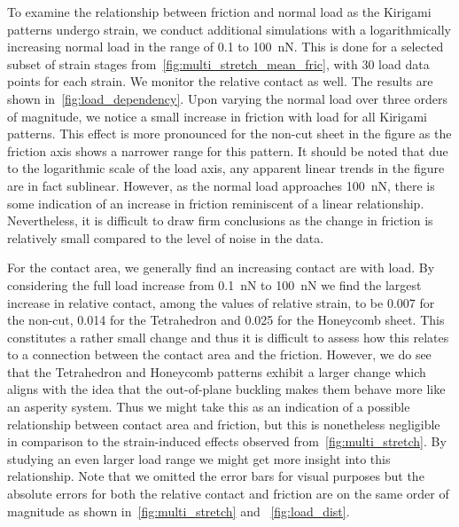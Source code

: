 To examine the relationship between friction and normal load as the Kirigami
patterns undergo strain, we conduct additional simulations with a
logarithmically increasing normal load in the range of 0.1 to \SI{100}{nN}. This
is done for a selected subset of strain stages
from~\cref{fig:multi_stretch_mean_fric}, with 30 load data points for each
strain. We monitor the relative contact as well. The results are shown
in~\cref{fig:load_dependency}. Upon varying the normal load over three orders of
magnitude, we notice a small increase in friction with load for all Kirigami
patterns. This effect is more pronounced for the non-cut sheet in the figure as
the friction axis shows a narrower range for this pattern. It should be noted
that due to the logarithmic scale of the load axis, any apparent linear trends
in the figure are in fact sublinear. However, as the normal load approaches
\SI{100}{nN}, there is some indication of an increase in friction
reminiscent of a linear relationship. Nevertheless, it is difficult to draw firm
conclusions as the change in friction is relatively small compared to the level
of noise in the data. 

For the contact area, we generally find an increasing contact are with load. By
considering the full load increase from \SI{0.1}{nN} to \SI{100}{nN} we find the
largest increase in relative contact, among the values of relative strain, to be
0.007 for the non-cut, 0.014 for the Tetrahedron and 0.025 for the Honeycomb
sheet. This constitutes a rather small change and thus it is difficult to assess
how this relates to a connection between the contact area and the friction.
However, we do see that the Tetrahedron and Honeycomb patterns exhibit a larger
change which aligns with the idea that the out-of-plane buckling makes them
behave more like an asperity system. Thus we might take this as an indication of
a possible relationship between contact area and friction, but this is
nonetheless negligible in comparison to the strain-induced effects observed
from~\cref{fig:multi_stretch}. By studying an even larger load range we might
get more insight into this relationship. Note that we omitted the error bars for
visual purposes but the absolute errors for both the relative contact and
friction are on the same order of magnitude as shown in~\cref{fig:multi_stretch}
and ~\cref{fig:load_dist}.


